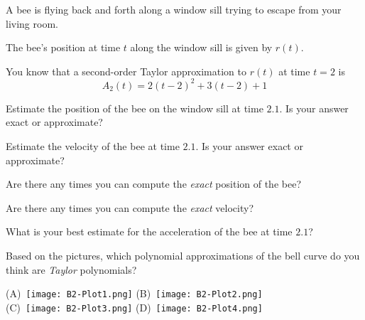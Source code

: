 \documentclass{workbook}
\begin{document}
\begin{slide}
	\question
	A bee is flying back and forth along a window sill trying to escape from your living room. 

	The bee's position at time $t$ along the window sill is given by $r(t)$.
	
	You know that a second-order Taylor approximation to $r(t)$ at time $t=2$
	is
	\[
		A_2(t)=2(t-2)^2 + 3(t-2) + 1
	\]

	\begin{parts}
	\item Estimate the position of the bee on the window sill at time 
		$2.1$. Is your answer exact or approximate?
		\item Estimate the velocity of the bee at time $2.1$. Is your answer exact or approximate?
		\item Are there any times you can compute the \emph{exact} position of the bee?
		\item Are there any times you can compute the \emph{exact} velocity?
		\item What is your best estimate for the acceleration of the 
		bee at time $2.1$?
	\end{parts}
\end{slide}

\begin{slide}
	\question
	Based on the pictures, which polynomial approximations of the bell curve do you think
	are \emph{Taylor} polynomials?

	(A)~\texttt{[image: B2-Plot1.png]}
	(B)~\texttt{[image: B2-Plot2.png]}\\
	(C)~\texttt{[image: B2-Plot3.png]}
	(D)~\texttt{[image: B2-Plot4.png]}
\end{slide}
\end{document}

